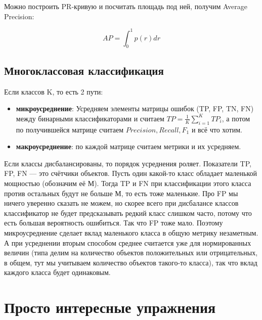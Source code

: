 \documentclass[12pt]{article}
\begin{document}
Можно построить PR-кривую и посчитать площадь под ней, получим Average Precision:

\[ AP = \int_0^1 p(r) dr \]

\subsection*{Многоклассовая классификация}

Если классов K, то есть 2 пути:
\begin{itemize}
    \item \textbf{микроусреднение}: Усредняем элементы матрицы ошибок (TP, FP, TN, FN) между бинарными классификаторами и считаем $TP = \frac{1}{K} \sum_{i=1}^K TP_i$, а потом по получившейся матрице считаем $Precision, Recall, F_1$ и всё что хотим.
    \item \textbf{макроусреднение}: по каждой матрице считаем метрики и их усредняем.
\end{itemize}

Если классы дисбалансированы, то порядок усреднения роляет. Показатели TP, FP, FN — это счётчики объектов. Пусть один какой-то класс обладает маленькой мощностью (обозначим её М). Тогда  TP и FN при классификации этого класса против остальных будут не больше М, то есть тоже маленькие. Про FP мы ничего уверенно сказать не можем, но скорее всего при дисбалансе классов классификатор не будет предсказывать редкий класс слишком часто, потому что есть большая вероятность ошибиться. Так что FP тоже мало. Поэтому микроусреднение сделает вклад маленького класса в общую метрику незаметным. А при усреднении вторым способом среднее считается уже для нормированных величин (типа делим на количество объектов положительных или отрицательных, в общем, тут мы учитываем количество объектов такого-то класса), так что вклад каждого класса будет одинаковым.

\section*{Просто интересные упражнения}
\end{document}
